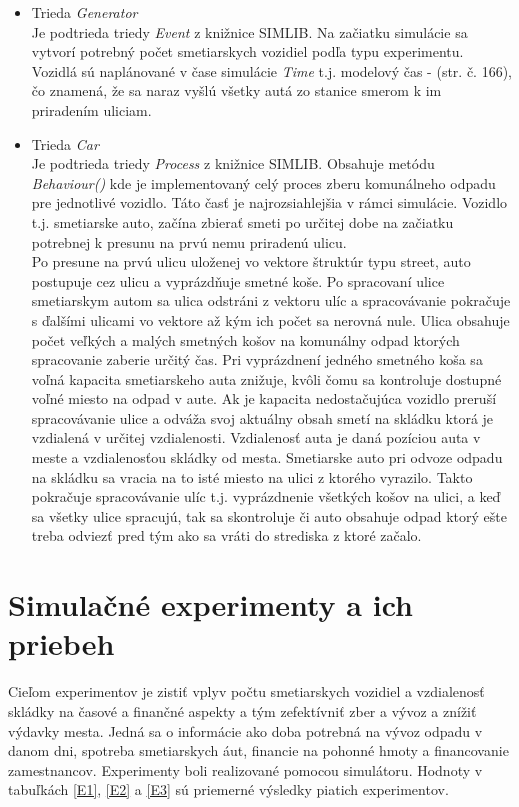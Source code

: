 \documentclass[11pt,a4paper]{article}
\begin{document}
    \begin{itemize}
        \item Trieda \textit{Generator}\\[0.1em]
              Je podtrieda triedy \textit{Event} z knižnice SIMLIB. Na začiatku simulácie sa vytvorí potrebný počet smetiarskych vozidiel podľa typu experimentu. Vozidlá sú naplánované v čase simulácie \textit{Time} t.j. modelový čas - \cite{IMS}(str. č. 166), čo znamená, že sa naraz vyšlú všetky autá zo stanice smerom k im priradením uliciam. {\color{red}{DOBA stredisko-1. ulica!}}
        \item Trieda \textit{Car}\\[0.1em]
              Je podtrieda triedy \textit{Process} z knižnice SIMLIB. Obsahuje metódu \textit{Behaviour()} kde je implementovaný celý proces zberu komunálneho odpadu pre jednotlivé vozidlo. Táto časť je najrozsiahlejšia v rámci simulácie. Vozidlo t.j. smetiarske auto, začína zbierať smeti po určitej dobe na začiatku potrebnej k presunu na prvú nemu priradenú ulicu.\\[0.3em]
              Po presune na prvú ulicu uloženej vo vektore štruktúr typu street, auto postupuje cez ulicu a vyprázdňuje smetné koše. Po spracovaní ulice smetiarskym autom sa ulica odstráni z vektoru ulíc a spracovávanie pokračuje s ďalšími ulicami vo vektore až kým ich počet sa nerovná nule. Ulica obsahuje počet veľkých a malých smetných košov na komunálny odpad ktorých spracovanie zaberie určitý čas. Pri vyprázdnení jedného smetného koša sa voľná kapacita smetiarskeho auta znižuje, kvôli čomu sa kontroluje dostupné voľné miesto na odpad v aute. Ak je kapacita nedostačujúca vozidlo preruší spracovávanie ulice a odváža svoj aktuálny obsah smetí na skládku ktorá je vzdialená v určitej vzdialenosti. Vzdialenosť auta je daná pozíciou auta v meste a vzdialenosťou skládky od mesta. Smetiarske auto pri odvoze odpadu na skládku sa vracia na to isté miesto na ulici z ktorého vyrazilo. Takto pokračuje spracovávanie ulíc t.j. vyprázdnenie všetkých košov na ulici, a keď sa všetky ulice spracujú, tak sa skontroluje či auto obsahuje odpad ktorý ešte treba odviezť pred tým ako sa vráti do strediska z ktoré začalo.
    \end{itemize}

\section{Simulačné experimenty a ich priebeh}

    \indent Cieľom experimentov je zistiť vplyv počtu smetiarskych vozidiel a vzdialenosť skládky na časové a finančné aspekty a tým zefektívniť zber a vývoz a znížiť výdavky mesta. Jedná sa o informácie ako doba potrebná na vývoz odpadu v danom dni, spotreba smetiarskych áut, financie na pohonné hmoty a financovanie zamestnancov. Experimenty boli realizované pomocou simulátoru. Hodnoty v tabuľkách \ref{E1}, \ref{E2} a \ref{E3} sú priemerné výsledky piatich experimentov.
\end{document}
